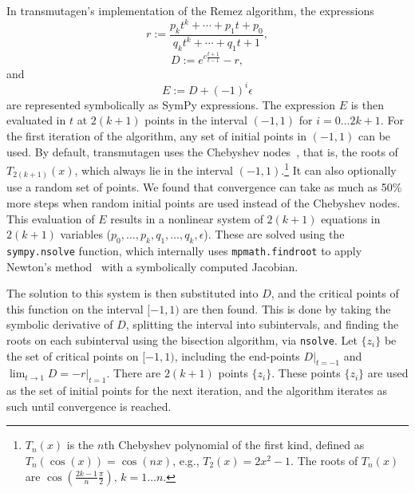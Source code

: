 In transmutagen's implementation of the Remez algorithm, the expressions
\begin{equation}
  r := \frac{p_kt^k + \cdots + p_1t + p_0}{q_kt^k + \cdots +
    q_1t + 1},
\end{equation}
\begin{equation}
  D := e^{c\frac{t+1}{t-1}} - r,
\end{equation}
and
\begin{equation}
  E := D + (-1)^i\epsilon
\end{equation}
are represented symbolically as SymPy expressions. The expression $E$ is then
evaluated in $t$ at $2(k + 1)$ points in the interval $(-1, 1)$ for
$i=0\ldots 2k+1$. For the first iteration of the algorithm, any set of initial
points in $(-1, 1)$ can be used. By default, transmutagen uses the Chebyshev
nodes~\cite{ationneeded}, that is, the roots of $T_{2(k +1)}(x)$, which always
lie in the interval $(-1, 1)$.\footnote{$T_n(x)$ is the $n$th Chebyshev
  polynomial of the first kind, defined as $T_n(\cos(x)) = \cos(nx)$, e.g.,
  $T_2(x) = 2x^2 - 1$. The roots of $T_n(x)$ are
  $\cos{\left (\frac{2k - 1}{n}\frac{\pi}{2} \right )},\,k=1\ldots n$.} It can
also optionally use a random set of points. We found that convergence can take
as much as 50\% more steps when random initial points are used instead of the
Chebyshev nodes. This evaluation of $E$ results in a
nonlinear system of $2(k+1)$ equations in $2(k+1)$ variables
($p_0,\ldots,p_k,q_1,\ldots,q_k,\epsilon$). These are solved using the
\texttt{sympy.nsolve} function, which internally uses \texttt{mpmath.findroot}
to apply Newton's method~\cite{ationneeded} with a symbolically computed
Jacobian.

\label{sec:nsolve-bisection}
The solution to this system is then substituted into $D$, and the critical
points of this function on the interval $[-1, 1)$ are then found. This is done
by taking the symbolic derivative of $D$, splitting the interval into
subintervals, and finding the roots on each subinterval using the bisection
algorithm, via \texttt{nsolve}. Let $\{z_i\}$ be the set of critical points on
$[-1, 1)$, including the end-points $D|_{t=-1}$ and
$\lim_{t\to 1} D=-r|_{t=1}$. There are $2(k+1)$ points $\{z_i\}$. These points
$\{z_i\}$ are used as the set of initial points for the next iteration, and
the algorithm iterates as such until convergence is reached.

